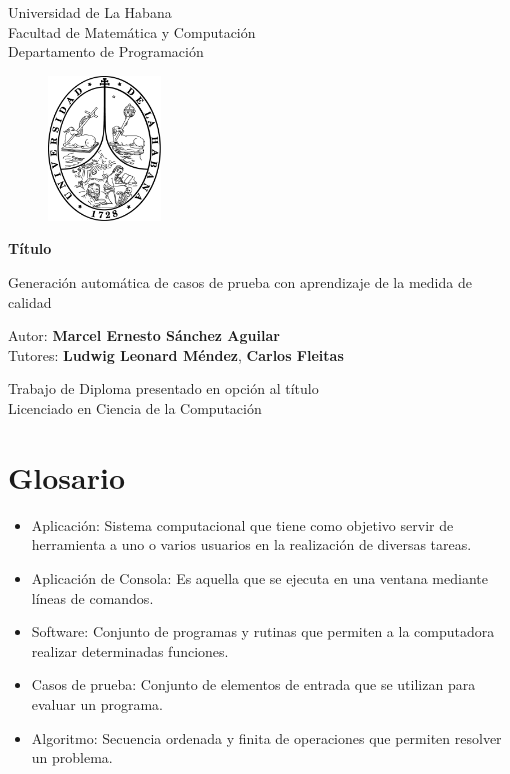 \documentclass[a4paper,12pt]{book}
\begin{document}
	
	\begin{titlepage}
		\begin{center}
			\vspace*{-1in}
			Universidad de La Habana \\
			Facultad de Matemática y Computación \\
			Departamento de Programación \\
			\vspace*{0.15in}
			\begin{figure}[htb]
				\begin{center}
					\includegraphics[width=3cm]{./Graphics/uhlogo.pdf}
				\end{center}
			\end{figure}
			
			\vspace*{0.3in}
			\textbf{Título} \\
			\begin{large}
			Generación automática de casos de prueba con aprendizaje de la medida de calidad \\
			\end{large}
			\vspace*{0.6in}
			Autor: \textbf{Marcel Ernesto Sánchez Aguilar} \\
			Tutores: \textbf{Ludwig Leonard Méndez}, \textbf{Carlos Fleitas}
			
			
			\vspace*{0.6in}
			Trabajo de Diploma presentado en opción al título\\
			Licenciado en Ciencia de la Computación
		\end{center}
	\end{titlepage}
	
	

\chapter*{Glosario}
	\begin{itemize}
		\item Aplicación: Sistema computacional que tiene como objetivo servir de herramienta a uno o varios usuarios en la realización de diversas tareas.
		\item Aplicación de Consola: Es aquella que se ejecuta en una ventana mediante líneas de comandos.
		\item Software: Conjunto de programas y rutinas que permiten a la computadora realizar determinadas funciones.
		\item Casos de prueba: Conjunto de elementos de entrada que se utilizan para evaluar un programa.
		\item Algoritmo: Secuencia ordenada y finita de operaciones que permiten resolver un problema.
	\end{itemize}
	
\end{document}
